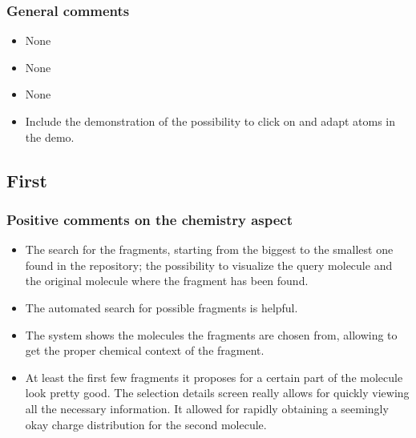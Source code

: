 \subsubsection{General comments}
\begin{itemize}
\item None

\item None

\item None

\item Include the demonstration of the possibility to click on and adapt atoms in the demo.

\end{itemize}


\subsection{First}
\subsubsection{Positive comments on the chemistry aspect}
\begin{itemize}
\item The search for the fragments, starting from the biggest to the smallest one found in the repository; the possibility to visualize the query molecule and the original molecule where the fragment has been found.

\item The automated search for possible fragments is helpful. 

\item The system shows the molecules the fragments are chosen from, allowing to get the proper chemical context of the fragment.

\item At least the first few fragments it proposes for a certain part of the molecule look pretty good. The selection details screen really allows for quickly viewing all the necessary information. It allowed for rapidly obtaining a seemingly okay charge distribution for the second molecule.

\end{itemize}


